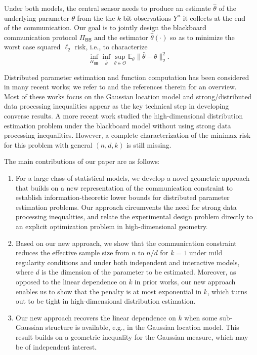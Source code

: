 \documentclass[final,12pt]{colt2018} %
\def \bE {\mathbb{E}}
\begin{document}
Under both models, the central sensor needs to produce an estimate $\hat{\theta}$ of the underlying parameter $\theta$ from the the $k$-bit observations $Y^n$ it collects at the end of the communication. Our goal is to jointly design the blackboard communication protocol $\Pi_{\mathsf{BB}}$ and the estimator $\hat{\theta}(\cdot)$ so as to minimize the worst case squared $\ell_2$ risk, i.e., to characterize
$$
\inf_{\Pi_{\mathsf{BB}}}\inf_{\hat{\theta}}\sup_{\theta\in\Theta} \bE_{\theta}\|\hat{\theta}-\theta\|_2^2.
$$

Distributed parameter estimation and function computation has been considered in many recent works; we refer to \cite{duchi2013local,zhang2013information,shamir2014fundamental,garg2014communication,braverman2016communication,xu2017information} and the references therein for an overview. Most of these works focus on the Gaussian location model and strong/distributed data processing inequalities appear as the key technical step in developing converse results. A more recent work \cite{diakonikolas2017communication} studied the high-dimensional distribution estimation problem under the blackboard model %
without using strong data processing inequalities. However, a complete characterization of the minimax risk for this problem with general $(n,d,k)$ is still missing.

The main contributions of our paper are as follows:
\begin{enumerate}
	\item For a large class of statistical models, we develop a novel geometric approach that builds on a new representation of the communication constraint to establish information-theoretic lower bounds for distributed parameter estimation problems. Our approach circumvents the need for strong data processing inequalities, and relate the experimental design problem directly to an explicit optimization problem in high-dimensional geometry.
	\item Based on our new approach, we show that the communication constraint reduces the effective sample size from $n$ to $n/d$ for $k=1$ under mild regularity conditions and under both independent and interactive models, where $d$ is the dimension of the parameter to be estimated. Moreover, as opposed to the linear dependence on $k$ in prior works, our new approach enables us to show that the penalty is at most exponential in $k$, which turns out to be tight in high-dimensional distribution estimation.
	\item Our new approach recovers the linear dependence on $k$ when some sub-Gaussian structure is available, e.g., in the Gaussian location model. This result builds on a geometric inequality for the Gaussian measure, which may be of independent interest. 
\end{enumerate}
\end{document}

